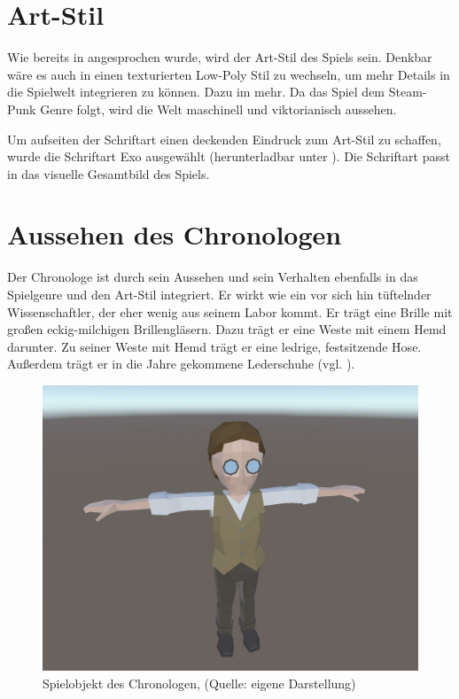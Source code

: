 \section{Art-Stil}
Wie bereits in  angesprochen wurde, wird der Art-Stil des Spiels  sein. Denkbar wäre es auch in einen texturierten Low-Poly Stil zu wechseln, um mehr Details in die Spielwelt integrieren zu können. Dazu im  mehr. Da das Spiel dem Steam-Punk Genre folgt, wird die Welt maschinell und viktorianisch aussehen.

Um aufseiten der Schriftart einen deckenden Eindruck zum Art-Stil zu schaffen, wurde die Schriftart Exo ausgewählt (herunterladbar unter \cite{gama_fonts_nodate}). Die Schriftart passt in das visuelle Gesamtbild des Spiels.

\section{Aussehen des Chronologen}
Der Chronologe ist durch sein Aussehen und sein Verhalten ebenfalls in das Spielgenre und den Art-Stil integriert. Er wirkt wie ein vor sich hin tüftelnder Wissenschaftler, der eher wenig aus seinem Labor kommt. Er trägt eine Brille mit großen eckig-milchigen Brillengläsern. Dazu trägt er eine Weste mit einem Hemd darunter. Zu seiner Weste mit Hemd trägt er eine ledrige, festsitzende Hose. Außerdem trägt er in die Jahre gekommene Lederschuhe (vgl. ).

\begin{figure}[ht]
\centering
\includegraphics[width=0.8\linewidth]{content/pictures/Chronologe.jpg}
\caption{Spielobjekt des Chronologen, (Quelle: eigene Darstellung)}
\label{fig:chronologe}
\end{figure}

